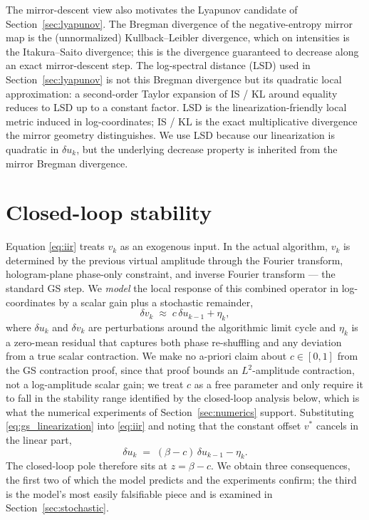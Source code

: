 \documentclass[11pt,a4paper]{article}
\begin{document}
The mirror-descent view also motivates the Lyapunov candidate of
Section~\ref{sec:lyapunov}. The Bregman divergence of the negative-entropy
mirror map is the (unnormalized) Kullback--Leibler divergence, which on
intensities is the Itakura--Saito divergence; this is the divergence
guaranteed to decrease along an exact mirror-descent step. The
log-spectral distance (LSD) used in Section~\ref{sec:lyapunov} is not this
Bregman divergence but its quadratic local approximation: a second-order
Taylor expansion of IS / KL around equality reduces to LSD up to a
constant factor. LSD is the linearization-friendly local metric induced
in log-coordinates; IS / KL is the exact multiplicative divergence the
mirror geometry distinguishes. We use LSD because our linearization is
quadratic in $\delta u_k$, but the underlying decrease property is
inherited from the mirror Bregman divergence.

\section{Closed-loop stability}\label{sec:stability}

Equation \eqref{eq:iir} treats $v_k$ as an exogenous input. In the actual
algorithm, $v_k$ is determined by the previous virtual amplitude through the
Fourier transform, hologram-plane phase-only constraint, and inverse Fourier
transform --- the standard GS step. We \emph{model} the local response of
this combined operator in log-coordinates by a scalar gain plus a stochastic
remainder,
\begin{equation}
  \delta v_k \;\approx\; c\,\delta u_{k-1} + \eta_k,
  \label{eq:gs_linearization}
\end{equation}
where $\delta u_k$ and $\delta v_k$ are perturbations around the algorithmic
limit cycle and $\eta_k$ is a zero-mean residual that captures both phase
re-shuffling and any deviation from a true scalar contraction. We make no
a-priori claim about $c\in[0,1]$ from the GS contraction proof, since that
proof bounds an $L^{2}$-amplitude contraction, not a log-amplitude scalar
gain; we treat $c$ as a free parameter and only require it to fall in the
stability range identified by the closed-loop analysis below, which is what
the numerical experiments of Section~\ref{sec:numerics} support.
Substituting \eqref{eq:gs_linearization} into \eqref{eq:iir} and noting that
the constant offset $v^*$ cancels in the linear part,
\begin{equation}
  \delta u_k \;=\; (\beta - c)\,\delta u_{k-1} - \eta_k.
  \label{eq:closed_loop}
\end{equation}
The closed-loop pole therefore sits at $z=\beta - c$. We obtain three
consequences, the first two of which the model predicts and the
experiments confirm; the third is the model's most easily falsifiable
piece and is examined in Section~\ref{sec:stochastic}.
\end{document}
